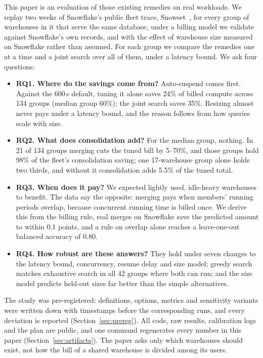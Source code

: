 \documentclass[conference]{IEEEtran}
\begin{document}
This paper is an evaluation of those existing remedies on real workloads. We replay two weeks of Snowflake's public fleet
trace, Snowset~\cite{snowset}, for every group of warehouses in it that serve the same database, under a billing model we
validate against Snowflake's own records, and with the effect of warehouse size measured on Snowflake rather than assumed.
For each group we compare the remedies one at a time and a joint search over all of them, under a latency bound. We ask
four questions:
\begin{itemize}
\item \textbf{RQ1. Where do the savings come from?} Auto-suspend comes first. Against the 600\,s default, tuning it alone
saves 24\% of billed compute across 134 groups (median group 60\%); the joint search saves 35\%. Resizing almost never pays
under a latency bound, and the reason follows from how queries scale with size.
\item \textbf{RQ2. What does consolidation add?} For the median group, nothing. In 21 of 134 groups merging cuts the tuned
bill by 5--70\%, and those groups hold 98\% of the fleet's consolidation saving; one 17-warehouse group alone holds two
thirds, and without it consolidation adds 5.5\% of the tuned total.
\item \textbf{RQ3. When does it pay?} We expected lightly used, idle-heavy warehouses to benefit. The data say the opposite:
merging pays when members' running periods overlap, because concurrent running time is billed once. We derive this from
the billing rule, real merges on Snowflake save the predicted amount to within 0.1 points, and a rule on overlap alone reaches a
leave-one-out balanced accuracy of 0.80.
\item \textbf{RQ4. How robust are these answers?} They hold under seven changes to the latency bound, concurrency, resume
delay and size model; greedy search matches exhaustive search in all 42 groups where both can run; and the size model
predicts held-out sizes far better than the simple alternatives.
\end{itemize}
The study was pre-registered: definitions, options, metrics and sensitivity variants were written down with timestamps
before the corresponding runs, and every deviation is reported (Section~\ref{sec:prereg}). All code, raw results,
calibration logs and the plan are public, and one command regenerates every number in this paper
(Section~\ref{sec:artifacts}). The paper asks only which warehouses should exist, not how the bill of a shared warehouse is
divided among its users.
\end{document}
